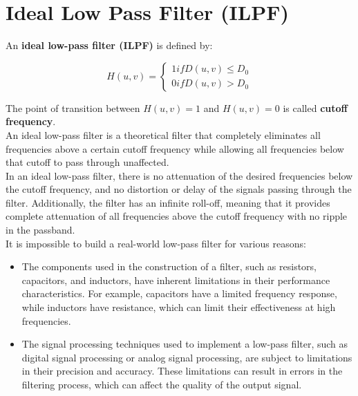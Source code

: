 \documentclass{article}
\begin{document}
\newpage

\section*{Ideal Low Pass Filter (ILPF)}

An \textbf{ideal low-pass filter (ILPF)} is defined by:

\begin{equation*}
    H(u, v) = \begin{cases}
      1 if D(u,v) \leq D_0\\
      0 if D(u,v) > D_0
    \end{cases}
\end{equation*}

The point of transition between $H(u,v) = 1$ and $H(u,v) = 0$ is called \textbf{cutoff frequency}. \\

An ideal low-pass filter is a theoretical filter that completely eliminates all frequencies above a certain cutoff frequency while allowing all frequencies below that cutoff to pass through unaffected. \\

In an ideal low-pass filter, there is no attenuation of the desired frequencies below the cutoff frequency, and no distortion or delay of the signals passing through the filter. Additionally, the filter has an infinite roll-off, meaning that it provides complete attenuation of all frequencies above the cutoff frequency with no ripple in the passband. \\

It is impossible to build a real-world low-pass filter for various reasons:
\begin{itemize}
    \item The components used in the construction of a filter, such as resistors, capacitors, and inductors, have inherent limitations in their performance characteristics. For example, capacitors have a limited frequency response, while inductors have resistance, which can limit their effectiveness at high frequencies.
    \item The signal processing techniques used to implement a low-pass filter, such as digital signal processing or analog signal processing, are subject to limitations in their precision and accuracy. These limitations can result in errors in the filtering process, which can affect the quality of the output signal.
\end{itemize}
\end{document}
